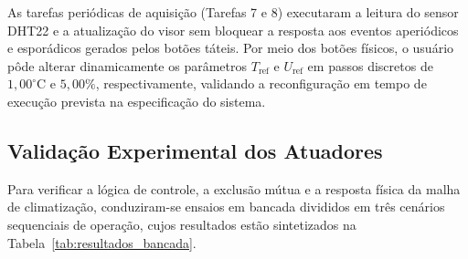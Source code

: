 \documentclass[conference]{IEEEtran}
\begin{document}
As tarefas periódicas de aquisição (Tarefas 7 e 8) executaram a leitura do sensor DHT22 e a atualização do visor sem bloquear a resposta aos eventos aperiódicos e esporádicos gerados pelos botões táteis. Por meio dos botões físicos, o usuário pôde alterar dinamicamente os parâmetros $T_{\text{ref}}$ e $U_{\text{ref}}$ em passos discretos de $1{,}00^\circ\text{C}$ e $5{,}00\%$, respectivamente, validando a reconfiguração em tempo de execução prevista na especificação do sistema.

\subsection{Validação Experimental dos Atuadores}

Para verificar a lógica de controle, a exclusão mútua e a resposta física da malha de climatização, conduziram-se ensaios em bancada divididos em três cenários sequenciais de operação, cujos resultados estão sintetizados na Tabela~\ref{tab:resultados_bancada}.

\begin{table}[H]
\centering
\caption{Estados operacionais observados nos testes de bancada do protótipo.}
\label{tab:resultados_bancada}
\scriptsize
\setlength{\tabcolsep}{3pt}
\end{table}
\end{document}
